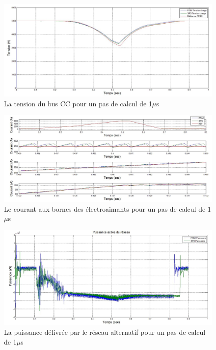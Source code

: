 \begin{figure}[htb]
\centering
\includegraphics[scale=0.5]{fig/DCP_AFE/1u/ten_bus.jpg}
\caption{La tension du bus CC pour un pas de calcul de 1$\mu$s}
\label{AF_DC_vch1}
\end{figure}

\begin{figure}[htb]
\centering
\includegraphics[scale=0.5]{fig/DCP_AFE/1u/cour_ch.jpg}
\caption{Le courant aux bornes des électroaimants pour un pas de calcul de 1$\mu$s}
\label{AF_DC_CHA1}
\end{figure}

\begin{figure}[htb]
\centering
\includegraphics[scale=0.5]{fig/DCP_AFE/1u/PUI.jpg}
\caption{La puissance délivrée par le réseau alternatif pour un pas de calcul de 1$\mu$s}
\label{AF_DC_CHA2}
\end{figure}


